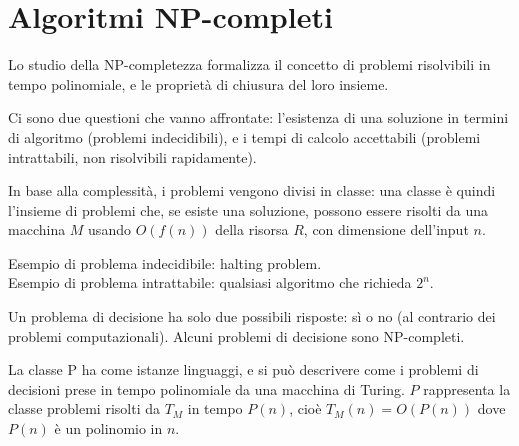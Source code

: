 \section{Algoritmi NP-completi}
Lo studio della NP-completezza formalizza il concetto di problemi risolvibili in tempo polinomiale, e le proprietà di chiusura del loro insieme.

Ci sono due questioni che vanno affrontate: l'esistenza di una soluzione in termini di algoritmo (problemi indecidibili), e i tempi di calcolo accettabili (problemi intrattabili, non risolvibili rapidamente).

In base alla complessità, i problemi vengono divisi in classe: una classe è quindi l'insieme di problemi che, se esiste una soluzione, possono essere risolti da una macchina $M$ usando $O(f(n))$ della risorsa $R$, con dimensione dell'input $n$.

Esempio di problema indecidibile: halting problem. \\
Esempio di problema intrattabile: qualsiasi algoritmo che richieda $2^n$. 

Un problema di decisione ha solo due possibili risposte: sì o no (al contrario dei problemi computazionali). Alcuni problemi di decisione sono NP-completi.

La classe P ha come istanze linguaggi, e si può descrivere come i problemi di decisioni prese in tempo polinomiale da una macchina di Turing. $P$ rappresenta la classe problemi risolti da $T_M$ in tempo $P(n)$, cioè $T_M(n) = O(P(n))$ dove $P(n)$ è un polinomio in $n$.

